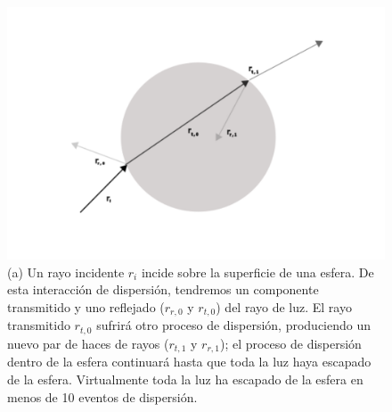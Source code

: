 \documentclass[10pt,aspectratio=1610,compress,dvipsnames]{beamer}
\begin{document}
\begin{frame}
{\begin{figure}
    \centering
    \includegraphics[scale=0.16]{beadrayoptics2.png}
    \caption{(a) Un rayo incidente $r_i$ incide sobre la superficie de una esfera. De esta interacción de dispersión, tendremos un componente transmitido y uno reflejado ($r_{r,0}$ y $r_{t,0}$) del rayo de luz. El rayo transmitido $r_{t,0}$ sufrirá otro proceso de dispersión, produciendo un nuevo par de haces de rayos ($r_{t,1}$ y $r_{r,1}$); el proceso de dispersión dentro de la esfera continuará hasta que toda la luz haya escapado de la esfera. Virtualmente toda la luz ha escapado de la esfera en menos de 10 eventos de dispersión.}
    \label{bead_optics}
\end{figure}
}



\end{frame}
\end{document}
